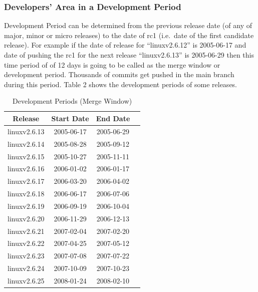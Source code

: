 \documentclass{acm_proc_article-sp}
\begin{document}
\subsubsection{Developers' Area in a Development Period}
Development Period can be determined from the previous release date (of any of major, minor or micro releases) to the date of rc1 (i.e.\ date of the first candidate release). For example if the date of release for ``linuxv2.6.12'' is 2005-06-17 and date of pushing the rc1 for the next release ``linuxv2.6.13'' is 2005-06-29 then this time period of of 12 days is going to be called as the merge window or development period. Thousands of commits get pushed in the main branch during this period. Table 2 shows the development periods of some releases.

\begin{table}[ht]
\caption{Development Periods (Merge Window)}  %
\centering 						%
\begin{tabular}{c c c c}				%
\hline\hline						%
Release 			& Start Date		& End Date \\ [0.5ex]
\hline 							%
linuxv2.6.13		& 2005-06-17	& 2005-06-29 \\
linuxv2.6.14		& 2005-08-28	& 2005-09-12 \\
linuxv2.6.15		& 2005-10-27	& 2005-11-11 \\
linuxv2.6.16		& 2006-01-02	& 2006-01-17 \\
linuxv2.6.17		& 2006-03-20	& 2006-04-02 \\
linuxv2.6.18		& 2006-06-17	& 2006-07-06 \\
linuxv2.6.19		& 2006-09-19	& 2006-10-04 \\
linuxv2.6.20  		& 2006-11-29	& 2006-12-13 \\
linuxv2.6.21		& 2007-02-04	& 2007-02-20 \\
linuxv2.6.22		& 2007-04-25	& 2007-05-12 \\
linuxv2.6.23		& 2007-07-08	& 2007-07-22 \\
linuxv2.6.24		& 2007-10-09	& 2007-10-23 \\
linuxv2.6.25		& 2008-01-24	& 2008-02-10 \\
[1ex]							%
\hline 							%
\end{tabular}
\label{table:nonlin} 				%
\end{table}
\end{document}
